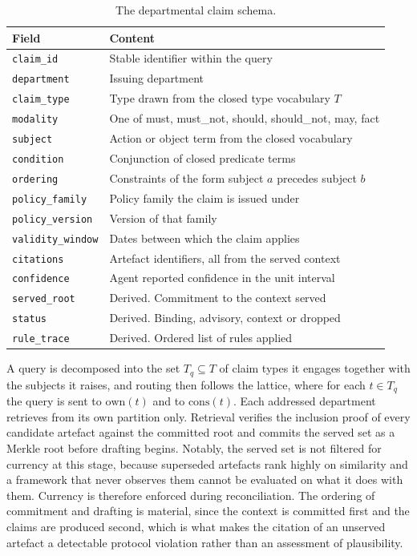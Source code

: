 \documentclass[journal]{IEEEtran}
\begin{document}
\begin{table}[!t]
\centering
\caption{The departmental claim schema.}
\label{tab:claim}
\footnotesize
\begin{tabular}{@{}>{\raggedright\arraybackslash}p{}>{\raggedright\arraybackslash}p{}@{}}
\toprule
Field & Content \\
\midrule
\texttt{claim\_id} & Stable identifier within the query \\
\texttt{department} & Issuing department \\
\texttt{claim\_type} & Type drawn from the closed type vocabulary $T$ \\
\texttt{modality} & One of must, must\_not, should, should\_not, may, fact \\
\texttt{subject} & Action or object term from the closed vocabulary \\
\texttt{condition} & Conjunction of closed predicate terms \\
\texttt{ordering} & Constraints of the form subject $a$ precedes subject $b$ \\
\texttt{policy\_family} & Policy family the claim is issued under \\
\texttt{policy\_version} & Version of that family \\
\texttt{validity\_window} & Dates between which the claim applies \\
\texttt{citations} & Artefact identifiers, all from the served context \\
\texttt{confidence} & Agent reported confidence in the unit interval \\
\midrule
\texttt{served\_root} & Derived. Commitment to the context served \\
\texttt{status} & Derived. Binding, advisory, context or dropped \\
\texttt{rule\_trace} & Derived. Ordered list of rules applied \\
\bottomrule
\end{tabular}
\end{table}

A query is decomposed into the set $T_q\subseteq T$ of claim types it engages together with the subjects it raises, and routing then follows the lattice, where for each $t\in T_q$ the query is sent to $\mathrm{own}(t)$ and to $\mathrm{cons}(t)$. Each addressed department retrieves from its own partition only. Retrieval verifies the inclusion proof of every candidate artefact against the committed root and commits the served set as a Merkle root before drafting begins. Notably, the served set is not filtered for currency at this stage, because superseded artefacts rank highly on similarity and a framework that never observes them cannot be evaluated on what it does with them. Currency is therefore enforced during reconciliation. The ordering of commitment and drafting is material, since the context is committed first and the claims are produced second, which is what makes the citation of an unserved artefact a detectable protocol violation rather than an assessment of plausibility.
\end{document}
